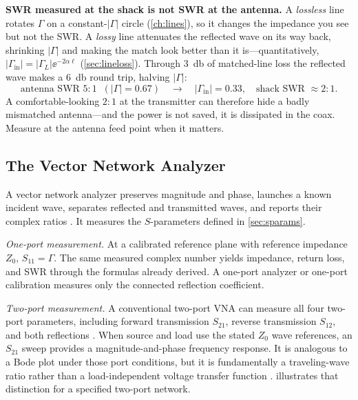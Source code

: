 \begin{mistakebox}
\textbf{SWR measured at the shack is not SWR at the antenna.} A \emph{lossless} line
rotates \(\Gamma\) on a constant-\(|\Gamma|\) circle (\cref{ch:lines}), so it changes
the impedance you see but not the SWR. A \emph{lossy} line attenuates the reflected
wave on its way back, shrinking \(|\Gamma|\) and making the match look better than it
is---quantitatively, \(|\Gamma_{\mathrm{in}}|=|\Gamma_L|\ee^{-2\alpha\ell}\)
(\cref{sec:lineloss}). Through \SI{3}{\decibel} of matched-line loss the reflected
wave makes a \SI{6}{\decibel} round trip, halving \(|\Gamma|\):
\[
\text{antenna SWR } 5\!:\!1 \;\;(|\Gamma|=0.67)
\quad\longrightarrow\quad
|\Gamma_{\mathrm{in}}|=0.33,
\quad
\text{shack SWR } \approx 2\!:\!1 .
\]
A comfortable-looking \(2\!:\!1\) at the transmitter can therefore hide a badly
mismatched antenna---and the power is not saved, it is dissipated in the coax. Measure
at the antenna feed point when it matters.
\end{mistakebox}

\subsection{The Vector Network Analyzer}
\label{sec:vna}
A vector network analyzer preserves magnitude and phase, launches a known incident
wave, separates reflected and transmitted waves, and reports their complex ratios
\cite[pp.~196--205]{free2022rfmicrowave}. It measures the \(S\)-parameters defined in
\cref{sec:sparams}.

\emph{One-port measurement.} At a calibrated reference plane with reference impedance
\(Z_0\), \(S_{11}=\Gamma\). The same measured complex number yields impedance,
return loss, and SWR through the formulas already derived. A one-port analyzer or
one-port calibration measures only the connected reflection coefficient.

\emph{Two-port measurement.} A conventional two-port VNA can measure all four
two-port parameters, including forward transmission \(S_{21}\), reverse transmission
\(S_{12}\), and both reflections \cite[pp.~196--197]{free2022rfmicrowave}. When source
and load use the stated \(Z_0\) wave references, an \(S_{21}\) sweep provides a
magnitude-and-phase frequency response. It is analogous to a Bode plot under those
port conditions, but it is fundamentally a traveling-wave ratio rather than a
load-independent voltage transfer function \cite[pp.~155--157]{free2022rfmicrowave}.
 illustrates that distinction for a specified two-port network.

